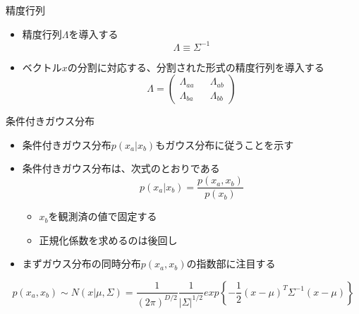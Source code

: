 \begin{frame}{精度行列}
 \begin{itemize}
  \item \alert{精度行列}$\Lambda$を導入する
        \begin{equation}
         \Lambda \equiv \Sigma^{-1}
        \end{equation}

  \item ベクトル$x$の分割に対応する、分割された形式の精度行列を導入する
        \begin{equation}
         \Lambda=
          \begin{pmatrix}
           \Lambda_{aa} && \Lambda_{ab}\\
           \Lambda_{ba} && \Lambda_{bb}
          \end{pmatrix}
        \end{equation}
 \end{itemize}
\end{frame}


\begin{frame}{条件付きガウス分布}
 \begin{itemize}
  \item 条件付きガウス分布$p(x_a|x_b)$もガウス分布に従うことを示す
  \item 条件付きガウス分布は、次式のとおりである
        \begin{equation}
         p(x_a | x_b) = \frac{p(x_a, x_b)}{p(x_b)}
        \end{equation}
        \begin{itemize}
         \item $x_b$を観測済の値で固定する
         \item 正規化係数を求めるのは後回し
        \end{itemize}
  \item まずガウス分布の同時分布$p(x_a,x_b)$の指数部に注目する
 \end{itemize}
 \begin{equation}
  p(x_a,x_b) \sim N(x|\mu,\Sigma) = \frac{1}{(2\pi)^{D/2}}\frac{1}{|\Sigma|^{1/2}}exp\left\{-\frac{1}{2}(x - \mu)^{T}\Sigma^{-1}(x-\mu)\right\}
 \end{equation}
\end{frame}

